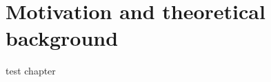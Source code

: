 \chapter{Motivation and theoretical background}

test chapter \cite{Noether:1918zz} \cite{Gibaldi:80}
